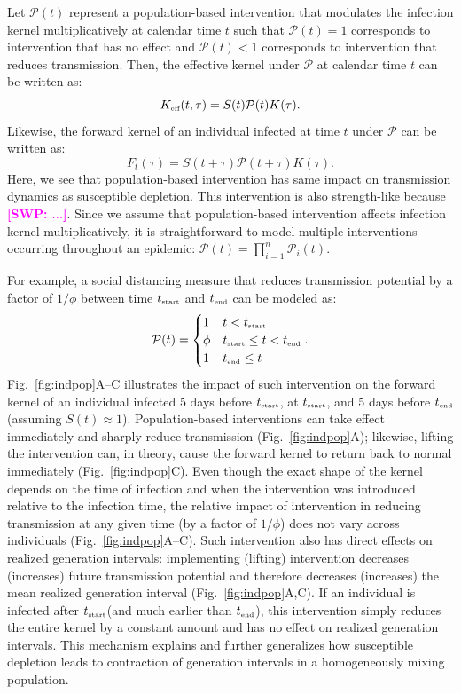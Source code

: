 \documentclass[12pt]{article}
\newcommand{\comment}{\showcomment}
\newcommand{\showcomment}[3]{\textcolor{#1}{\textbf{[#2: }\textsl{#3}\textbf{]}}}
\newcommand{\swp}[1]{\comment{magenta}{SWP}{#1}}
\newcommand{\fref}[1]{Fig.~\ref{fig:#1}}
\newcommand{\tsub}[2]{#1_{{\textrm{\tiny #2}}}}
\newcommand{\tstart}{\ensuremath{\tsub{t}{start}}\xspace}
\newcommand{\tend}{\ensuremath{\tsub{t}{end}}\xspace}
\newcommand{\Keff}{\ensuremath{\tsub{K}{eff}}\xspace}
\newcommand{\PP}{{\mathcal P}}
\begin{document}
Let $\PP(t)$ represent a population-based intervention that modulates the infection kernel multiplicatively at calendar time $t$ such that $\PP(t)=1$ corresponds to intervention that has no effect and $\PP(t) < 1$ corresponds to intervention that reduces transmission.
Then, the effective kernel under $\PP$ at calendar time $t$ can be written as:
\begin{equation}
\Keff(t, \tau) = S(t) \PP(t) K(\tau).
\end{equation}
Likewise, the forward kernel of an individual infected at time $t$ under $\PP$ can be written as:
\begin{equation}
F_t(\tau) = S(t+\tau) \PP(t + \tau) K(\tau).
\end{equation}
Here, we see that population-based intervention has same impact on transmission dynamics as susceptible depletion.
This intervention is also strength-like because \swp{...}.
Since we assume that population-based intervention affects infection kernel multiplicatively, it is straightforward to model multiple interventions occurring throughout an epidemic: $\PP(t) = \prod_{i=1}^n \PP_i(t)$.

For example, a social distancing measure that reduces transmission potential by a factor of $1/\phi$ between time \tstart and \tend can be modeled as:
\begin{equation}
\PP(t) = \begin{cases}
1 & t < \tstart\\
\phi & \tstart \leq t < \tend\\
1 & \tend \leq t
\end{cases}.
\end{equation}
\fref{indpop}A--C illustrates the impact of such intervention on the forward kernel of an individual infected 5 days before $\tstart$, at $\tstart$, and 5 days before $\tend$ (assuming $S(t) \approx 1$).
Population-based interventions can take effect immediately and sharply reduce transmission (\fref{indpop}A);
likewise, lifting the intervention can, in theory, cause the forward kernel to return back to normal immediately (\fref{indpop}C).
Even though the exact shape of the kernel depends on the time of infection and when the intervention was introduced relative to the infection time, the relative impact of intervention in reducing transmission at any given time (by a factor of $1/\phi$) does not vary across individuals (\fref{indpop}A--C).
Such intervention also has direct effects on realized generation intervals:
implementing (lifting) intervention decreases (increases) future transmission potential and therefore decreases (increases) the mean realized generation interval (\fref{indpop}A,C).
If an individual is infected after \tstart (and much earlier than \tend), this intervention simply reduces the entire kernel by a constant amount and has no effect on realized generation intervals.
This mechanism explains and further generalizes how susceptible depletion leads to contraction of generation intervals in a homogeneously mixing population. 
\end{document}
